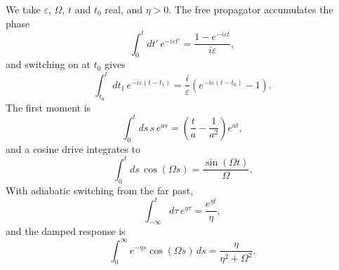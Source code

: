 \documentclass{article}
\begin{document}
We take $\varepsilon$, $\Omega$, $t$ and $t_0$ real, and $\eta>0$.
The free propagator accumulates the phase
\begin{equation}
\int_0^{t} dt'\, e^{-i\varepsilon t'} = \frac{1-e^{-i\varepsilon t}}{i\varepsilon},
\label{eq:phase}
\end{equation}
and switching on at $t_0$ gives
\begin{equation}
\int_{t_0}^{t}dt_1\, e^{-i\varepsilon(t-t_1)} = \frac{i}{\varepsilon}\left(e^{-i\varepsilon(t-t_0)}-1\right).
\label{eq:switch}
\end{equation}
The first moment is
\begin{equation}
\int_0^{t} ds\, s\, e^{a s} = \left(\frac{t}{a}-\frac{1}{a^2}\right)e^{a t},
\label{eq:moment}
\end{equation}
and a cosine drive integrates to
\begin{equation}
\int_0^{t} ds\, \cos(\Omega s) = \frac{\sin(\Omega t)}{\Omega}.
\label{eq:drive}
\end{equation}
With adiabatic switching from the far past,
\begin{equation}
\int_{-\infty}^{t} d\tau\, e^{\eta\tau} = \frac{e^{\eta t}}{\eta},
\label{eq:adiabatic}
\end{equation}
and the damped response is
\begin{equation}
\int_0^\infty e^{-\eta s}\cos(\Omega s)\,ds = \frac{\eta}{\eta^2+\Omega^2}.
\label{eq:damped}
\end{equation}
\end{document}

